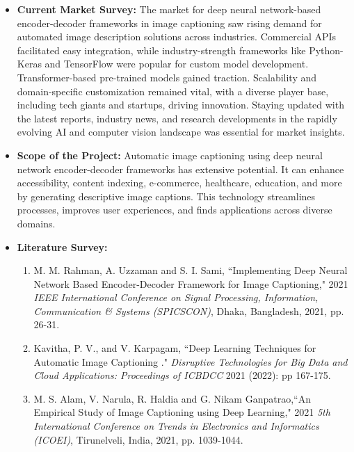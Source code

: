 \documentclass[12pt]{report}	%
\begin{document}
{{\begin{itemize}
\item{\textbf{Current Market Survey:}}
\newline
The market for deep neural network-based encoder-decoder frameworks in image captioning saw rising demand for automated image description solutions across industries. Commercial APIs facilitated easy integration, while industry-strength frameworks like Python-Keras and TensorFlow were popular for custom model development. Transformer-based pre-trained models gained traction. Scalability and domain-specific customization remained vital, with a diverse player base, including tech giants and startups, driving innovation. Staying updated with the latest reports, industry news, and research developments in the rapidly evolving AI and computer vision landscape was essential for market insights.


\item{\textbf{Scope of the Project:}}
\newline
Automatic image captioning using deep neural network encoder-decoder frameworks has extensive potential. It can enhance accessibility, content indexing, e-commerce, healthcare, education, and more by generating descriptive image captions. This technology streamlines processes, improves user experiences, and finds applications across diverse domains. 


\item{\textbf{Literature Survey:}}
\begin{enumerate}




\item M. M. Rahman, A. Uzzaman and S. I. Sami, ``Implementing Deep Neural Network Based Encoder-Decoder Framework for Image Captioning," 2021 \emph{IEEE International Conference on Signal Processing, Information, Communication \& Systems (SPICSCON)}, Dhaka, Bangladesh, 2021, pp. 26-31.

\item Kavitha, P. V., and V. Karpagam, ``Deep Learning Techniques for Automatic Image Captioning   ." \emph{Disruptive Technologies for Big Data and Cloud Applications: Proceedings of ICBDCC} 2021 (2022): pp 167-175.

\item M. S. Alam, V. Narula, R. Haldia and G. Nikam Ganpatrao,``An Empirical Study of Image Captioning using Deep Learning," 2021 \emph{5th International Conference on Trends in Electronics and Informatics (ICOEI)}, Tirunelveli, India, 2021, pp. 1039-1044.



\end{enumerate}
\end{itemize}}}
\end{document}
